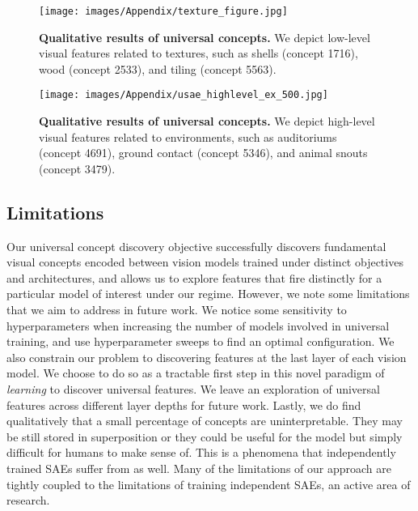 \begin{figure*}[t]
    \centering
    \texttt{[image: images/Appendix/texture\_figure.jpg]}
    \caption{\textbf{Qualitative results of universal concepts.} We depict low-level visual features related to textures, such as shells (concept 1716), wood (concept 2533), and tiling (concept 5563).}
    \label{fig:qual_app_texture}
\end{figure*}

\begin{figure*}[t]
    \centering
    \texttt{[image: images/Appendix/usae\_highlevel\_ex\_500.jpg]}
    \caption{\textbf{Qualitative results of universal concepts.} We depict high-level visual features related to environments, such as auditoriums (concept 4691), ground contact (concept 5346), and animal snouts (concept 3479).}
    \label{fig:qual_app_highlevel}
\end{figure*}




\subsection{Limitations}

Our universal concept discovery objective successfully discovers fundamental visual concepts encoded between vision models trained under distinct objectives and architectures, and allows us to explore features that fire distinctly for a particular model of interest under our regime. However, we note some limitations that we aim to address in future work. We notice some sensitivity to hyperparameters when increasing the number of models involved in universal training, and use hyperparameter sweeps to find an optimal configuration. 
We also constrain our problem to discovering features at the last layer of each vision model. We choose to do so as a tractable first step in this novel paradigm of \emph{learning} to discover universal features. We leave an exploration of universal features across different layer depths for future work. 
Lastly, we do find qualitatively that a small percentage of concepts are uninterpretable. They may be still stored in superposition \cite{elhage2022toy} or they could be useful for the model but simply difficult for humans to make sense of. This is a phenomena that independently trained SAEs suffer from as well.
Many of the limitations of our approach are tightly coupled to the limitations of training independent SAEs, an active area of research. 
